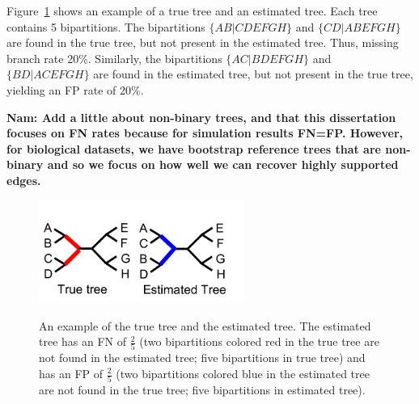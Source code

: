 Figure~\ref{back:tree_error} shows an example of a true tree and an estimated tree.  Each tree contains 5 bipartitions.  The bipartitions $\{AB|CDEFGH\}$ and $\{CD|ABEFGH\}$ are found in the true tree, but not present in the estimated tree.  Thus, missing branch rate 20\%.  Similarly, the bipartitions $\{AC|BDEFGH\}$ and $\{BD|ACEFGH\}$ are found in the estimated tree, but not present in the true tree, yielding an FP rate of 20\%.

\textbf{Nam:  Add a little about non-binary trees, and that this dissertation focuses on FN rates because for simulation results FN=FP.  However, for biological datasets, we have bootstrap reference trees that are non-binary and so we focus on how well we can recover highly supported edges.  }


\begin{figure}[htbp]
\centering
{\includegraphics[width=0.60\textwidth]{background/unrooted_phylogeny_a}}
\caption[Computing error metrics of estimated tree.]{An example of the true tree and the estimated tree.  The estimated tree has an FN of $\frac{2}{5}$ (two bipartitions colored red in the true tree are not found in the estimated tree; five bipartitions in true tree) and has an FP of $\frac{2}{5}$ (two bipartitions colored blue in the estimated tree are not found in the true tree; five bipartitions in estimated tree).}  
\label{back:tree_error}
\end{figure}



